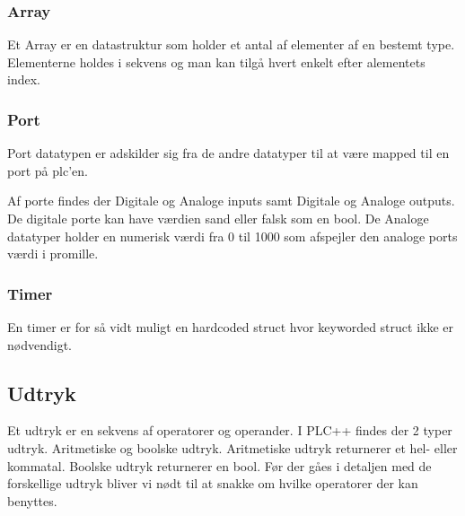 \subsubsection{Array}
Et Array er en datastruktur som holder et antal af elementer af en bestemt type. Elementerne holdes i sekvens og man kan tilgå hvert enkelt efter alementets index.

\subsubsection{Port}
Port datatypen er adskilder sig fra de andre datatyper til at være mapped til en port på \gls{plc}'en.

Af porte findes der Digitale og Analoge inputs samt Digitale og Analoge outputs. De digitale porte kan have værdien sand eller falsk som en bool. De Analoge datatyper holder en numerisk værdi fra 0 til 1000 som afspejler den analoge ports værdi i promille. 

\subsubsection{Timer}
En timer er for så vidt muligt en hardcoded struct hvor keyworded struct ikke er nødvendigt. 

\subsection{Udtryk}
Et udtryk er en sekvens af operatorer og operander. I PLC++ findes der 2 typer udtryk. Aritmetiske og boolske udtryk. Aritmetiske udtryk returnerer et hel- eller kommatal. Boolske udtryk returnerer en bool. Før der gåes i detaljen med de forskellige udtryk bliver vi nødt til at snakke om hvilke operatorer der kan benyttes.

